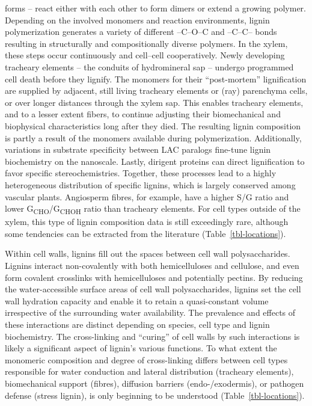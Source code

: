 \documentclass[journal=,manuscript=]{achemso}
\begin{document}
forms -- react either with each other to form dimers or extend a growing
polymer.\citep{Ralph2023} Depending on the involved monomers and
reaction environments, lignin polymerization generates a variety of
different --C--O--C and --C--C-- bonds resulting in structurally and
compositionally diverse polymers.\citep{Ralph2023} In the xylem, these
steps occur continuously and cell--cell cooperatively. Newly developing
tracheary elements -- the conduits of hydromineral sap -- undergo
programmed cell death before they lignify. The monomers for their
``post-mortem'' lignification are supplied by adjacent, still living
tracheary elements or (ray) parenchyma cells, or over longer distances
through the xylem sap.\citep{Pesquet2013, DeMeester2021, Zhang2020a}
This enables tracheary elements, and to a lesser extent fibers, to
continue adjusting their biomechanical and biophysical characteristics
long after they died.\citep{Menard2022} The resulting lignin composition
is partly a result of the monomers available during
polymerization.\citep{Ralph2023} Additionally, variations in substrate
specificity between LAC paralogs fine-tune lignin biochemistry on the
nanoscale.\citep{Blaschek2023, Zhuo2022} Lastly, dirigent proteins can
direct lignification to favor specific stereochemistries.\citep{Gao2023}
Together, these processes lead to a highly heterogeneous distribution of
specific lignins, which is largely conserved among vascular plants.
Angiosperm fibres, for example, have a higher S/G ratio and lower
G\textsubscript{CHO}/G\textsubscript{CHOH} ratio than tracheary
elements.\citep{Menard2022} For cell types outside of the xylem, this
type of lignin composition data is still exceedingly rare, although some
tendencies can be extracted from the literature
(Table~\ref{tbl-locations}).

Within cell walls, lignins fill out the spaces between cell wall
polysaccharides. Lignins interact non-covalently with both
hemicelluloses and cellulose,\citep{Kirui2022} and even form covalent
crosslinks with hemicelluloses and potentially
pectins.\citep{Giummarella2019} By reducing the water-accessible surface
areas of cell wall polysaccharides, lignins set the cell wall hydration
capacity and enable it to retain a quasi-constant volume irrespective of
the surrounding water availability.\citep{Blaschek2023} The prevalence
and effects of these interactions are distinct depending on species,
cell type and lignin biochemistry.\citep{Kirui2022} The cross-linking
and ``curing'' of cell walls by such interactions is likely a
significant aspect of lignin's various functions. To what extent the
monomeric composition and degree of cross-linking differs between cell
types responsible for water conduction and lateral distribution
(tracheary elements), biomechanical support (fibres), diffusion barriers
(endo-/exodermis), or pathogen defense (stress lignin), is only
beginning to be understood (Table~\ref{tbl-locations}).
\end{document}
